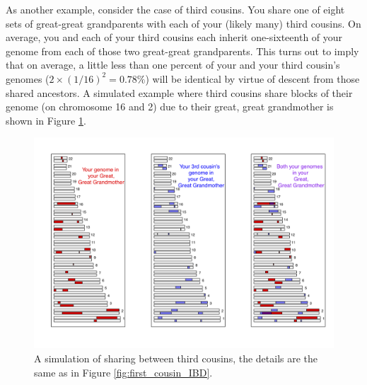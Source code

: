 {{As another example, consider the case of third cousins. You share one of eight sets of great-great grandparents with each of your (likely many) third cousins. On average, you and each of your third cousins each inherit one-sixteenth of your genome from each of those two great-great grandparents. This turns out to imply that on average, a little less than one percent of your and your third cousin's genomes ($2 \times (1/16)^2 =0.78\%$) will be identical by virtue of descent from those shared ancestors. A simulated example where third cousins share blocks of their genome (on chromosome 16 and 2) due to their great, great grandmother is shown in Figure \ref{fig:third_cousin_IBD}.

\begin{figure}
\begin{center}
\includegraphics[width= \textwidth]{figures/sharing_relatives/Third_cousin_overlap_1.png}
\end{center}
\caption[]{A simulation of sharing between third cousins, the details are the same as in Figure \ref{fig:first_cousin_IBD}.} \label{fig:third_cousin_IBD}
\end{figure}


}}
